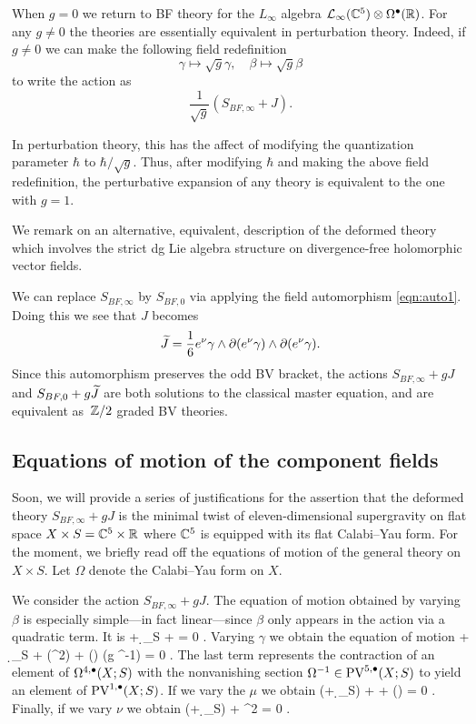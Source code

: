 When $g = 0$ we return to BF theory for the $L_\infty$ algebra $\mathcal L_\infty(\mathbb C^5) \otimes \Omega^\bullet(\mathbb R)$. 
For any $g \ne 0$ the theories are essentially equivalent in perturbation theory. 
Indeed, if $g \ne 0$ we can make the following field redefinition 
\[
\gamma \mapsto \sqrt{g} \gamma, \quad \beta \mapsto \sqrt{g} \beta 
\]
to write the action as 
\[
\frac{1}{\sqrt{g}} \left(S_{BF,\infty} + J \right)  .
\]

In perturbation theory, this has the affect of modifying the quantization parameter $\hbar$ to $\hbar / \sqrt{g}$.
Thus, after modifying $\hbar$ and making the above field redefinition, the perturbative expansion of any theory is equivalent to the one with $g = 1$. 

\parsec[s:altdfn]

We remark on an alternative, equivalent, description of the deformed theory which involves the strict dg Lie algebra structure on divergence-free holomorphic vector fields.

We can replace $S_{BF,\infty}$ by $S_{BF,0}$ via applying the field automorphism \eqref{eqn:auto1}.
Doing this we see that $J$ becomes 
\[
\widetilde{J} = \frac16 e^\nu \gamma \wedge \partial (e^\nu \gamma) \wedge \partial(e^\nu \gamma) .
\]
Since this automorphism preserves the odd BV bracket, the actions $S_{BF,\infty} + g J$ and $S_{BF, 0} + g \widetilde{J}$ are both solutions to the classical master equation, and are equivalent as~$\mathbb Z/2$ graded BV theories.

\subsection{Equations of motion of the component fields} \label{s:components}

Soon, we will provide a series of justifications for the assertion that the deformed theory $S_{BF, \infty} + g J$ is the minimal twist of eleven-dimensional supergravity on flat space $X \times S = \mathbb C^5 \times \mathbb R$ where $\mathbb C^5$ is equipped with its flat Calabi--Yau form. 
For the moment, we briefly read off the equations of motion of the general theory on $X \times S$.
Let $\Omega$ denote the Calabi--Yau form on $X$. 

We consider the action $S_{BF, \infty} + gJ$.
The equation of motion obtained by varying $\beta$ is especially simple---in fact linear---since $\beta$ only appears in the action via a quadratic term. 
It is
\beqn\label{eqn:eombeta}
\dbar \nu + \d_S \nu + \div \mu = 0 .
\eeqn
Varying $\gamma$ we obtain the equation of motion
\beqn\label{eqn:eomgamma}
\dbar \mu + \d_S \mu +   \div (\mu^2) +  (\del \gamma \wedge \del \gamma) \vee (g \Omega^{-1}) = 0 .
\eeqn
The last term represents the contraction of an element of $\Omega^{4,\bullet}(X;S)$ with the nonvanishing section $\Omega^{-1} \in {\rm PV}^{5,\bullet}(X;S)$ to yield an element of ${\rm PV}^{1,\bullet}(X;S)$. 
If we vary the $\mu$ we obtain 
\beqn\label{eqn:eommu}
(\dbar + \d_S) \gamma + \del \beta +  (\mu \vee \del \gamma) = 0 .
\eeqn
Finally, if we vary $\nu$ we obtain
\beqn\label{eqn:eomnu}
(\dbar + \d_S) \beta +   \mu^2 \vee \del \gamma = 0 .
\eeqn

